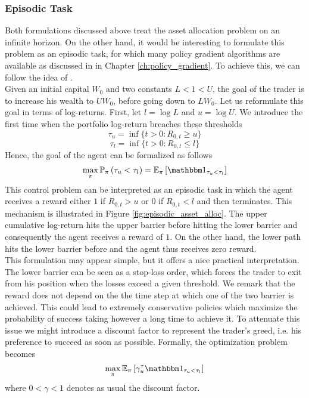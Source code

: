 \subsubsection{Episodic Task}
Both formulations discussed above treat the asset allocation problem on an infinite horizon. On the other hand, it would be interesting to formulate this problem as an episodic task, for which many policy gradient algorithms are available as discussed in  in Chapter \ref{ch:policy_gradient}. To achieve this, we can follow the idea of \cite{browne1995optimal}.\\
Given an initial capital $W_0$ and two constants $L < 1 < U$, the goal of the trader is to increase his wealth to $U W_0$, before going down to $L W_0$. Let us reformulate this goal in terms of log-returns. First, let $l = \log L$ and $u = \log U$. We introduce the first time when the portfolio log-return breaches these thresholds 
\begin{equation}
	\tau_u = \inf\{t > 0: R_{0,t} \geq u\}
\end{equation}
\begin{equation}
	\tau_l = \inf\{t > 0: R_{0,t} \leq l\}
\end{equation}
Hence, the goal of the agent can be formalized as follows 
\begin{equation}
	\max_\pi \P[\pi]{\tau_u < \tau_l} = \E[\pi]{\ind{\tau_u < \tau_l}}
\end{equation}
This control problem can be interpreted as an episodic task in which the agent receives a reward either $1$ if $R_{0,t} > u$ or $0$ if $R_{0,t} < l$ and then terminates. This mechanism is illustrated in Figure \ref{fig:episodic_asset_alloc}. The upper cumulative log-return hits the upper barrier before hitting the lower barrier and consequently the agent receives a reward of $1$. On the other hand, the lower path hits the lower barrier before and the agent thus receives zero reward.\\
This formulation may appear simple, but it offers a nice practical interpretation. The lower barrier can be seen as a stop-loss order, which forces the trader to exit from his position when the losses exceed a given threshold. We remark that the reward does not depend on the the time step at which one of the two barrier is achieved. This could lead to extremely conservative policies which maximize the probability of success taking however a long time to achieve it. To attenuate this issue we might introduce a discount factor to represent the trader's greed, i.e. his preference to succeed as soon as possible. Formally, the optimization problem becomes  
\begin{equation}
	\max_\pi \E[\pi]{\gamma^\tau_u \ind{\tau_u < \tau_l}}
\end{equation}
where $0 < \gamma < 1$ denotes as usual the discount factor. 

